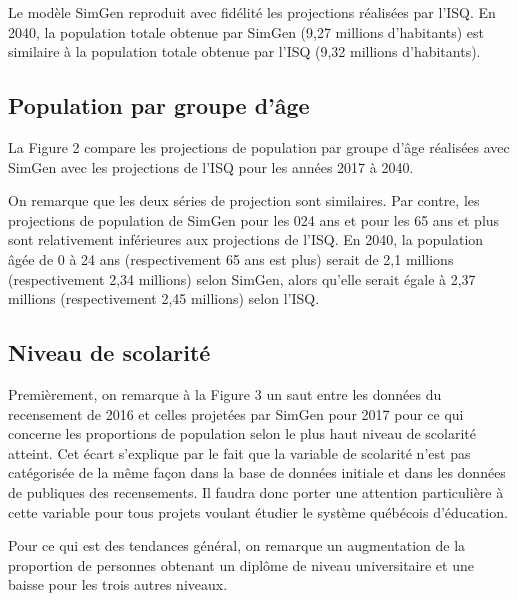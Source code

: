 \documentclass[letterpaper,10pt,french]{sphinxmanual}
\begin{document}
Le modèle SimGen reproduit avec fidélité les projections réalisées par l’ISQ. En 2040, la population totale obtenue par SimGen (9,27 millions d’habitants) est similaire à la population totale obtenue par l’ISQ (9,32 millions d’habitants).


\subsection{Population par groupe d’âge}
\label{\detokenize{resultats:population-par-groupe-d-age}}
\begin{figure}[htbp]
\centering

\noindent{}
\end{figure}

La Figure 2 compare les projections de population par groupe d’âge réalisées avec SimGen avec les projections de l’ISQ pour les années 2017 à 2040.

On remarque que les deux séries de projection sont similaires. Par contre, les projections de population de SimGen pour les 0\sphinxhyphen{}24 ans et pour les 65 ans et plus sont relativement inférieures aux projections de l’ISQ. En 2040, la population âgée de 0 à 24 ans (respectivement 65 ans est plus) serait de 2,1 millions (respectivement 2,34 millions) selon SimGen, alors qu’elle serait égale à 2,37 millions (respectivement 2,45 millions) selon l’ISQ.


\subsection{Niveau de scolarité}
\label{\detokenize{resultats:niveau-de-scolarite}}
\begin{figure}[htbp]
\centering

\noindent{}
\end{figure}

Premièrement, on remarque à la Figure 3 un saut entre les données du recensement de 2016 et celles projetées par SimGen pour 2017 pour ce qui concerne les proportions de population selon le plus haut niveau de scolarité atteint. Cet écart s’explique par le fait que la variable de scolarité n’est pas catégorisée de la même façon dans la base de données initiale et dans les données de publiques des recensements. Il faudra donc porter une attention particulière à cette variable pour tous projets voulant étudier le système québécois d’éducation.

Pour ce qui est des tendances général, on remarque un augmentation de la proportion de personnes obtenant un diplôme de niveau universitaire et une baisse pour les trois autres niveaux.
\end{document}
